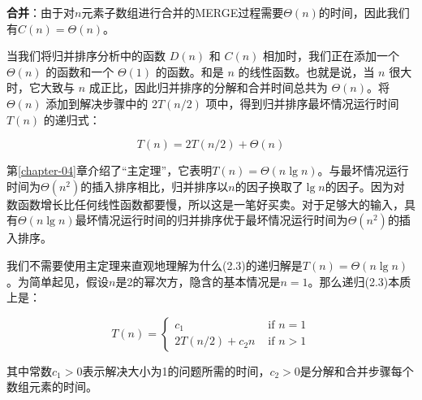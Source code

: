 \documentclass[lang=cn,newtx,10pt,scheme=chinese]{elegantbook}
\begin{document}
\textbf{合并}：由于对$n$元素子数组进行合并的MERGE过程需要$\Theta(n)$的时间，因此我们有$C(n)=\Theta(n)$。

当我们将归并排序分析中的函数 $D(n)$ 和 $C(n)$ 相加时，我们正在添加一个 $\Theta(n)$ 的函数和一个 $\Theta(1)$ 的函数。和是 $n$ 的线性函数。也就是说，当 $n$ 很大时，它大致与 $n$ 成正比，因此归并排序的分解和合并时间总共为 $\Theta(n)$。将 $\Theta(n)$ 添加到解决步骤中的 $2T(n/2)$ 项中，得到归并排序最坏情况运行时间 $T(n)$ 的递归式：

\begin{equation}
T(n)=2T(n/2)+\Theta(n)
\end{equation}

第\ref{chapter-04}章介绍了``主定理''，它表明$T(n)=\Theta(n\lg{n})$。与最坏情况运行时间为$\Theta(n^2)$的插入排序相比，归并排序以$n$的因子换取了$\lg n$的因子。因为对数函数增长比任何线性函数都要慢，所以这是一笔好买卖。对于足够大的输入，具有$\Theta(n \lg n)$最坏情况运行时间的归并排序优于最坏情况运行时间为$\Theta(n^2)$的插入排序。

我们不需要使用主定理来直观地理解为什么(2.3)的递归解是$T(n) = \Theta(n \lg n)$。为简单起见，假设$n$是2的幂次方，隐含的基本情况是$n = 1$。那么递归(2.3)本质上是：

\begin{equation}
T(n)= \begin{cases}c_1 & \text { if } n=1 \\ 2 T(n / 2)+c_2 n & \text { if } n>1\end{cases}
\end{equation}

其中常数$c_1 > 0$表示解决大小为1的问题所需的时间，$c_2 > 0$是分解和合并步骤每个数组元素的时间。
\end{document}
